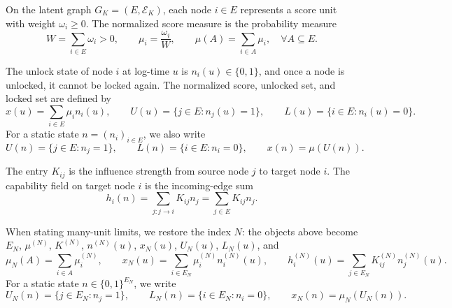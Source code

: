 \begin{definition}
\label{def:score-units-measure}
On the latent graph $G_K=(E,\mathcal E_K)$, each node $i\in E$ represents a score unit with weight $\omega_i\ge0$. The normalized score measure is the probability measure
\begin{equation*}
    W=\sum_{i\in E}\omega_i>0,
    \qquad
    \mu_i=\frac{\omega_i}{W},
    \qquad
    \mu(A)=\sum_{i\in A}\mu_i, \quad \forall A\subseteq E.
\end{equation*}
\end{definition}

\begin{definition}
\label{def:unlock-state-sets}
The unlock state of node $i$ at log-time $u$ is $n_i(u)\in\{0,1\}$, and once a node is unlocked, it cannot be locked again. The normalized score, unlocked set, and locked set are defined by
\begin{equation}\label{eq:frontier-unlocked-locked-sets}
    x(u)=\sum_{i\in E}\mu_i n_i(u),
    \qquad
    U(u)=\{j\in E:n_j(u)=1\},
    \qquad
    L(u)=\{i\in E:n_i(u)=0\}.
\end{equation}
For a static state $n=(n_i)_{i\in E}$, we also write
\begin{equation*}
    U(n)=\{j\in E:n_j=1\},
    \qquad
    L(n)=\{i\in E:n_i=0\},
    \qquad
    x(n)=\mu(U(n)).
\end{equation*}
\end{definition}

\begin{definition}
\label{def:task-influence-field}
The entry $K_{ij}$ is the influence strength from source node $j$ to target node $i$. The capability field on target node $i$ is the incoming-edge sum
\begin{equation*}
    h_i(n)=\sum_{j:j\to i}K_{ij}n_j=\sum_{j\in E}K_{ij}n_j.
\end{equation*}
\end{definition}


When stating many-unit limits, we restore the index $N$: the objects above become $E_N$, $\mu^{(N)}$, $K^{(N)}$, $n^{(N)}(u)$, $x_N(u)$, $U_N(u)$, $L_N(u)$, and
\begin{equation*}
    \mu_N(A)=\sum_{i\in A}\mu_i^{(N)},
    \qquad
    x_N(u)=\sum_{i\in E_N}\mu_i^{(N)}n_i^{(N)}(u),
    \qquad
    h_i^{(N)}(u)=\sum_{j\in E_N}K_{ij}^{(N)}n_j^{(N)}(u).
\end{equation*}
For a static state $n\in\{0,1\}^{E_N}$, we write
\begin{equation*}
    U_N(n)=\{j\in E_N:n_j=1\},
    \qquad
    L_N(n)=\{i\in E_N:n_i=0\},
    \qquad
    x_N(n)=\mu_N(U_N(n)).
\end{equation*}

